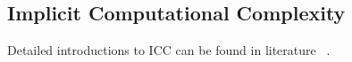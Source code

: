 \subsection{Implicit Computational Complexity}\label{subsec:icc}

Detailed introductions to ICC can be found in literature
~\cite{dallago2012,moyen2017,pechoux2020,dallago2022}.